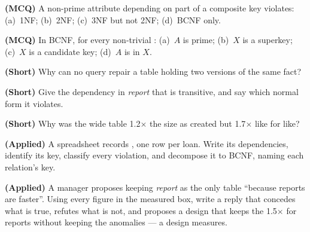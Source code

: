 \begin{reviewq}
  \item \textbf{(MCQ)} A non-prime attribute depending on part of a composite
        key violates: (a)~1NF; (b)~2NF; (c)~3NF but not 2NF; (d)~BCNF only.
  \item \textbf{(MCQ)} In BCNF, for every non-trivial : (a)~$A$ is
        prime; (b)~$X$ is a superkey; (c)~$X$ is a candidate key;
        (d)~$A$ is in $X$.
  \item \textbf{(Short)} Why can no query repair a table holding two versions
        of the same fact?
  \item \textbf{(Short)} Give the dependency in \textit{report} that is
        transitive, and say which normal form it violates.
  \item \textbf{(Short)} Why was the wide table 1.2$\times$ the size as
        created but 1.7$\times$ like for like?
  \item \textbf{(Applied)} A spreadsheet records
        , one row per loan. Write its dependencies,
        identify its key, classify every violation, and decompose it to BCNF,
        naming each relation's key.
  \item \textbf{(Applied)} A manager proposes keeping \textit{report} as the
        only table ``because reports are faster''. Using every figure in the
        measured box, write a reply that concedes what is true, refutes what is
        not, and proposes a design that keeps the 1.5$\times$ for reports
        without keeping the anomalies --- a design 
        measures.
\end{reviewq}
